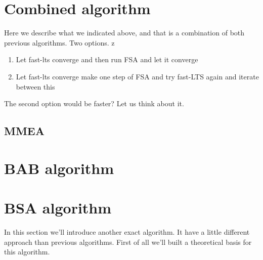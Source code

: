 
\section{Combined algorithm}
Here we describe what we indicated above, and that is a combination of both previous algorithms.
Two options. 
z
\begin{enumerate}
    \item Let fast-lts converge and then run FSA and let it converge
    \item Let fast-lts converge make one step of FSA and try fast-LTS again and iterate between this
\end{enumerate}

The second option would be faster? Let us think about it.



\subsection{MMEA}

\section{BAB algorithm}  %
\section{BSA algorithm}
In this section we'll introduce another exact algorithm. It have a little different approach than previous algorithms. First of all we'll built a theoretical basis for this algorithm.




